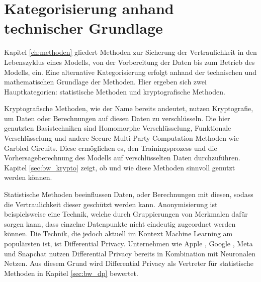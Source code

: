 \section{Kategorisierung anhand technischer Grundlage}
Kapitel \ref{ch:methoden} gliedert Methoden zur Sicherung der Vertraulichkeit in den Lebenszyklus eines Modells, von der Vorbereitung der Daten bis zum Betrieb des Modells, ein. 
Eine alternative Kategorisierung erfolgt anhand der technischen und mathematischen Grundlage der Methoden.
Hier ergeben sich zwei Hauptkategorien: statistische Methoden und kryptografische Methoden.

Kryptografische Methoden, wie der Name bereits andeutet, nutzen Kryptografie, um Daten oder Berechnungen auf diesen Daten zu verschlüsseln.
Die hier genutzten Basistechniken sind Homomorphe Verschlüsselung, Funktionale Verschlüsselung und andere Secure Multi-Party Computation Methoden wie Garbled Circuits.
Diese ermöglichen es, den Trainingsprozess und die Vorhersageberechnung des Modells auf verschlüsselten Daten durchzuführen.
Kapitel \ref{sec:bw_krypto} zeigt, ob und wie diese Methoden sinnvoll genutzt werden können.

Statistische Methoden beeinflussen Daten, oder Berechnungen mit diesen, sodass die Vertraulichkeit dieser geschützt werden kann.
Anonymisierung ist beispielsweise eine Technik, welche durch Gruppierungen von Merkmalen dafür sorgen kann, dass einzelne Datenpunkte nicht eindeutig zugeordnet werden können.
Die Technik, die jedoch aktuell im Kontext Machine Learning am populärsten ist, ist Differential Privacy. 
Unternehmen wie Apple \cite{apple_dp}, Google \cite{google_dp},  Meta \cite{meta_dp} und Snapchat \cite{snapchat_dp} nutzen Differential Privacy bereits in Kombination mit Neuronalen Netzen.
Aus diesem Grund wird Differential Privacy als Vertreter für statistische Methoden in Kapitel \ref{sec:bw_dp} bewertet.